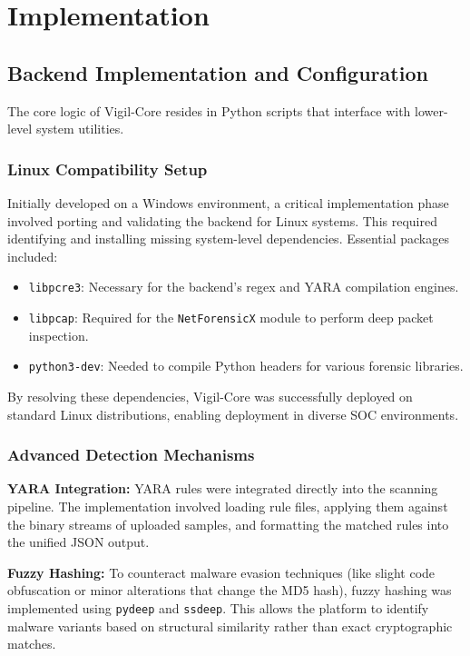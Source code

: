 \chapter{Implementation}

\section{Backend Implementation and Configuration}
The core logic of Vigil-Core resides in Python scripts that interface with lower-level system utilities.

\subsection{Linux Compatibility Setup}
Initially developed on a Windows environment, a critical implementation phase involved porting and validating the backend for Linux systems. This required identifying and installing missing system-level dependencies. Essential packages included:
\begin{itemize}
    \item \texttt{libpcre3}: Necessary for the backend's regex and YARA compilation engines.
    \item \texttt{libpcap}: Required for the \texttt{NetForensicX} module to perform deep packet inspection.
    \item \texttt{python3-dev}: Needed to compile Python headers for various forensic libraries.
\end{itemize}
By resolving these dependencies, Vigil-Core was successfully deployed on standard Linux distributions, enabling deployment in diverse SOC environments.

\subsection{Advanced Detection Mechanisms}
\textbf{YARA Integration:} YARA rules were integrated directly into the scanning pipeline. The implementation involved loading rule files, applying them against the binary streams of uploaded samples, and formatting the matched rules into the unified JSON output. 

\textbf{Fuzzy Hashing:} To counteract malware evasion techniques (like slight code obfuscation or minor alterations that change the MD5 hash), fuzzy hashing was implemented using \texttt{pydeep} and \texttt{ssdeep}. This allows the platform to identify malware variants based on structural similarity rather than exact cryptographic matches.

